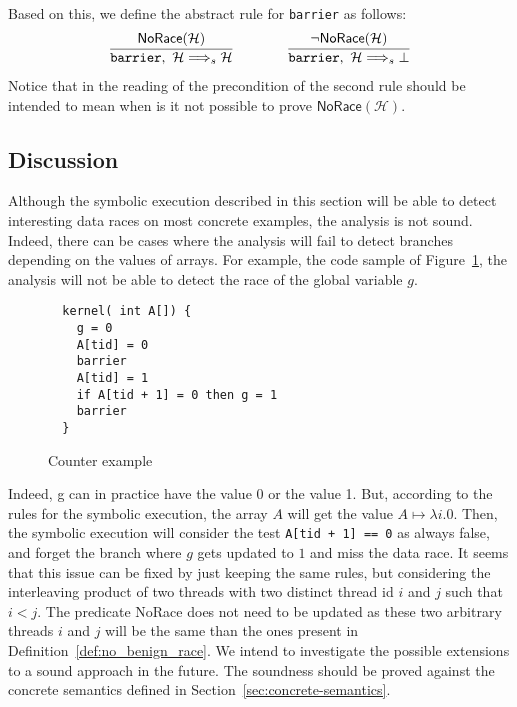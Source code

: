 \documentclass[a4paper,11pt]{llncs}
\newcommand{\barrier}{\texttt{barrier}\xspace}
\begin{document}
Based on this, we define the abstract rule for \barrier as follows:
\[
\begin{array}{ccc}
	\infer
		{ 	\barrier,~ \mathcal{H} \Longrightarrow_s \mathcal{H}
		 }
		{ \mathsf{NoRace}(\mathcal{H}) } 
		& \quad  \quad &
			\infer
		{ 	\barrier,~ \mathcal{H} \Longrightarrow_s \bot
		 }
		{ \neg \mathsf{NoRace}(\mathcal{H}) }
\end{array}
\]
Notice that in the reading of the precondition of the second  rule should be intended to mean when is it not possible to prove $\mathsf{NoRace}(\mathcal{H})$.

\subsection{Discussion}
\label{discussion}
Although the symbolic execution described in this section will be able to detect interesting data races on most concrete examples, the analysis is not sound. Indeed, there can be cases where the analysis will fail to detect branches depending on the values of arrays. For example, the code sample of Figure~\ref{fig:counterexample}, the analysis will not be able to detect the race of the global variable $g$.
\begin{figure}[t]
   \centering
\begin{verbatim}
  kernel( int A[]) { 
    g = 0
    A[tid] = 0
    barrier
    A[tid] = 1
    if A[tid + 1] = 0 then g = 1
    barrier
  }
\end{verbatim}
 \caption{Counter example}
 \label{fig:counterexample}
\end{figure}
Indeed, g can in practice have the value 0 or the value 1. But, according to the rules for the symbolic execution, the array $A$ will get the value $A \mapsto \lambda i. 0$. Then, the symbolic execution will consider the test \texttt{A[tid + 1] == 0} as always false, and forget the branch where $g$ gets updated to $1$ and miss the data race. It seems that this issue can be fixed by just keeping the same rules, but considering the interleaving product of two threads with two distinct thread id $i$ and $j$ such that $i < j$. The predicate {\sf NoRace} does not need to be updated as these two arbitrary threads $i$ and $j$ will be the same than the ones present in Definition~\ref{def:no_benign_race}. 
We intend to investigate the possible extensions to a sound approach in the future.
The soundness should be proved against the concrete semantics defined in Section~\ref{sec:concrete-semantics}.
\end{document}
